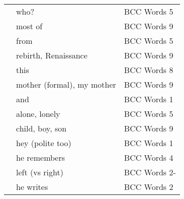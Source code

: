 \documentclass[10pt,twocolumn]{article}
\begin{document}
\begin{supertabular*}{\linewidth}{p{0.1\textwidth}p{0.2\textwidth}>{\footnotesize}p{0.2\textwidth}}
 & who? & BCC Words 5 \\
 & most of & BCC Words 9 \\
 & from & BCC Words 5 \\
 & rebirth, Renaissance & BCC Words 9 \\
 & this & BCC Words 8 \\
 & mother (formal), my mother & BCC Words 9 \\
 & and & BCC Words 1 \\
 & alone, lonely & BCC Words 5 \\
 & child, boy, son & BCC Words 9 \\
 & hey (polite too) & BCC Words 1 \\
 & he remembers & BCC Words 4 \\
 & left (vs right) & BCC Words 2- \\
 & he writes & BCC Words 2 \\
\end{supertabular*}
\end{document}
